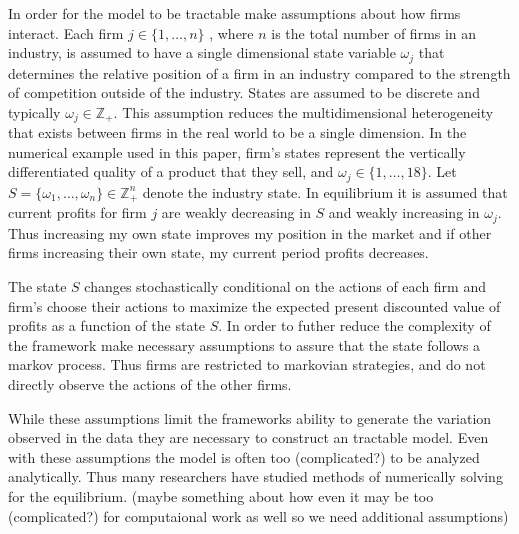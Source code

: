 \documentclass[12pt]{article}
\begin{document}

In order for the model to be tractable \citet{1995_Erickson_Pakes_RES} make assumptions about how firms interact. Each firm $j \in \{1, \dots, n\}$ , where $n$ is the total number of firms in an industry, is assumed to have a single dimensional state variable $\omega_j$ that determines the relative position of a firm in an industry compared to the strength of competition outside of the industry. States are assumed to be discrete and typically $\omega_j \in \mathbb{Z_+}$. This assumption reduces the multidimensional heterogeneity that exists between firms in the real world to be a single dimension. In the numerical example used in this paper, firm's states represent the vertically differentiated quality of a product that they sell, and $\omega_j \in \{1,\dots,18\}$. Let $S=\{\omega_1,\dots,\omega_n\} \in \mathbb{Z}_+^n$ denote the industry state. In equilibrium it is assumed that current profits for firm $j$ are weakly decreasing in $S$ and weakly increasing in $\omega_j$. Thus increasing my own state improves my position in the market and if other firms increasing their own state, my current period profits decreases.

The state $S$ changes stochastically conditional on the actions of each firm and firm's choose their actions to maximize the expected present discounted value of profits as a function of the state $S$. In order to futher reduce the complexity of the framework \citet{1995_Erickson_Pakes_RES} make necessary assumptions to assure that the state follows a markov process. Thus firms are restricted to markovian strategies, and do not directly observe the actions of the other firms.


While these assumptions limit the frameworks ability to generate the variation observed in the data they are necessary to construct an tractable model. Even with these assumptions the model is often too (complicated?) to be analyzed analytically. Thus many researchers have studied methods of numerically solving for the equilibrium. (maybe something about how even it may be too (complicated?) for computaional work as well so we need additional assumptions)
\end{document}
